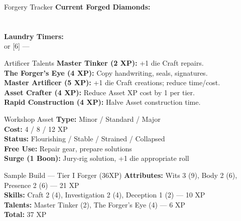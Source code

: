 \documentclass[10pt]{article}
\begin{document}
\begin{minipage}[t]{0.48\linewidth}
    \vspace{0.5em}
    
    \begin{charbox}{Forgery Tracker}
        \textbf{Current Forged Diamonds:}\\
        \underline{\hspace{7cm}}\\
        \underline{\hspace{7cm}}\\
        \textbf{Laundry Timers:}\\
        [4] or [6] --- \underline{\hspace{5cm}}
    \end{charbox}
\end{minipage}
\hfill
\begin{minipage}[t]{0.48\linewidth}
    \begin{charbox}{Artificer Talents}
        \textbf{Master Tinker (2 XP):} +1 die Craft repairs.\\
        \textbf{The Forger's Eye (4 XP):} Copy handwriting, seals, signatures.\\
        \textbf{Master Artificer (5 XP):} +1 die Craft creations; reduce time/cost.\\
        \textbf{Asset Crafter (4 XP):} Reduce Asset XP cost by 1 per tier.\\
        \textbf{Rapid Construction (4 XP):} Halve Asset construction time.
    \end{charbox}
    
    \vspace{0.5em}
    
    \begin{charbox}{Workshop Asset}
        \textbf{Type:} Minor / Standard / Major\\
        \textbf{Cost:} 4 / 8 / 12 XP\\
        \textbf{Status:} Flourishing / Stable / Strained / Collapsed\\
        \textbf{Free Use:} Repair gear, prepare solutions\\
        \textbf{Surge (1 Boon):} Jury-rig solution, +1 die appropriate roll
    \end{charbox}
    
    \vspace{0.5em}
    
    \begin{charbox}{Sample Build --- Tier I Forger (36XP)}
        \textbf{Attributes:} Wits 3 (9), Body 2 (6), Presence 2 (6) --- 21 XP\\
        \textbf{Skills:} Craft 2 (4), Investigation 2 (4), Deception 1 (2) --- 10 XP\\
        \textbf{Talents:} Master Tinker (2), The Forger's Eye (4) --- 6 XP\\
        \textbf{Total:} 37 XP
    \end{charbox}
\end{minipage}
\end{document}
